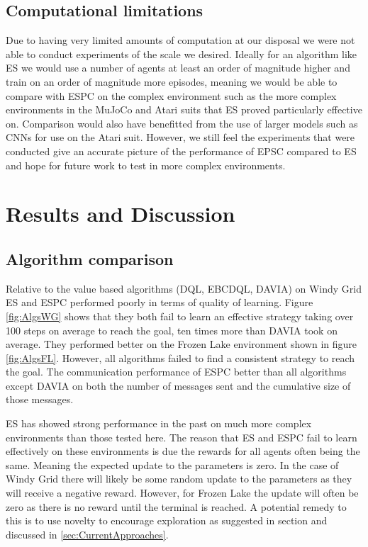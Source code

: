 \subsection{Computational limitations}
Due to having very limited amounts of computation at our disposal we were not able to conduct experiments of the scale we desired. Ideally for an algorithm like ES we would use a number of agents at least an order of magnitude higher and train on an order of magnitude more episodes, meaning we would be able to compare with ESPC on the complex environment such as the more complex environments in the MuJoCo \cite{MuJoCo} and Atari \cite{Atari} suits that ES proved particularly effective on. Comparison would also have benefitted from the use of larger models such as CNNs for use on the Atari suit. However, we still feel the experiments that were conducted give an accurate picture of the performance of EPSC compared to ES and hope for future work to test in more complex environments.

\section{Results and Discussion}

\subsection{Algorithm comparison}

Relative to the value based algorithms (DQL, EBCDQL, DAVIA) on Windy Grid ES and ESPC performed poorly in terms of quality of learning. Figure \ref{fig:AlgsWG} shows that they both fail to learn an effective strategy taking over 100 steps on average to reach the goal, ten times more than DAVIA took on average. They performed better on the Frozen Lake environment shown in figure \ref{fig:AlgsFL}. However, all algorithms failed to find a consistent strategy to reach the goal. The communication performance of ESPC better than all algorithms except DAVIA on both the number of messages sent and the cumulative size of those messages. 

ES has showed strong performance in the past on much more complex environments than those tested here. The reason that ES and ESPC fail to learn effectively on these environments is due the rewards for all agents often being the same. Meaning the expected update to the parameters is zero. In the case of Windy Grid there will likely be some random update to the parameters as they will receive a negative reward. However, for Frozen Lake the update will often be zero as there is no reward until the terminal is reached.
A potential remedy to this is to use novelty to encourage exploration as suggested in section \cite{NS-ES} and discussed in \ref{sec:CurrentApproaches}.


